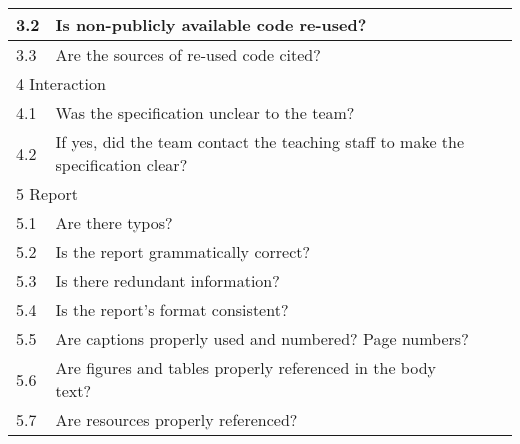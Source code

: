 \documentclass[%
	a4paper,
]
{article}
\begin{document}
\begin{table}[h!]
\begin{tabular}{
		|p{.025\linewidth}
		|p{.75\linewidth}
		|p{.05\linewidth}
		|p{.05\linewidth}|
	}
		3.2 & Is non-publicly available code re-used? & & \\\hline

		3.3 & Are the sources of re-used code cited? & & \\\hline

		\multicolumn{4}{|p{.95\linewidth}|}{\cellcolor{gray!20} 4 Interaction}
			\\\hline

		4.1 & Was the specification unclear to the team? & & \\\hline

		4.2 & If yes, did the team contact the teaching staff to make the specification
			clear? & & \\\hline

		\multicolumn{4}{|p{.95\linewidth}|}{\cellcolor{gray!20} 5 Report}
			\\\hline

		5.1 & Are there typos? & & \\\hline

		5.2 & Is the report grammatically correct? & & \\\hline

		5.3 & Is there redundant information? & & \\\hline

		5.4 & Is the report's format consistent? & & \\\hline

		5.5 & Are captions properly used and numbered? Page numbers? & & \\\hline

		5.6 & Are figures and tables properly referenced in the body text?
			& & \\\hline

		5.7 & Are resources properly referenced? & & \\\hline


		\hline

	\end{tabular}
\end{table}
%
%
%
%
%
\end{document}
